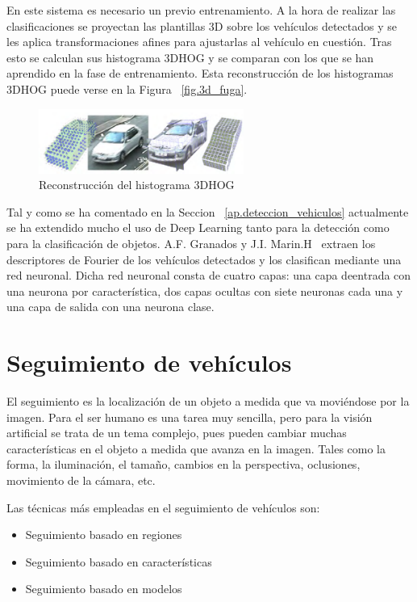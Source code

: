 En este sistema es necesario un previo entrenamiento. A la hora de realizar las clasificaciones se proyectan las plantillas 3D sobre los vehículos detectados y se les aplica transformaciones afines para ajustarlas al vehículo en cuestión. Tras esto se calculan sus histograma 3DHOG y se comparan con los que se han aprendido en la fase de entrenamiento. Esta reconstrucción de los histogramas 3DHOG puede verse en la Figura ~\ref{fig.3d_fuga}.

\begin{figure}[H]
  \begin{center}
    \includegraphics[width=0.6\textwidth]{figures/Estado_arte/3dhog_plantilla.png}
		\caption{Reconstrucción  del  histograma  3DHOG}
		\label{fig.3dhog_histograma}
		\end{center}
\end{figure}

Tal y como se ha comentado en la Seccion ~\ref{ap.deteccion_vehiculos} actualmente se ha extendido mucho el uso de Deep Learning tanto para la detección como para la clasificación de objetos. 
A.F. Granados y J.I. Marin.H~\cite{deteccion_flujo_vehicular} extraen los descriptores de Fourier de los vehículos detectados y los clasifican mediante una red neuronal. Dicha red neuronal consta de cuatro capas: una capa deentrada con una neurona por característica, dos capas ocultas con siete neuronas cada una y una capa de salida con una neurona clase. 


\section{Seguimiento de vehículos}

El seguimiento es la localización de un objeto a medida que va moviéndose por la imagen. Para el ser humano es una tarea muy sencilla, pero para la visión artificial se trata de un tema complejo, pues pueden cambiar muchas características en el objeto  a medida que avanza en la imagen. Tales como la forma, la iluminación, el tamaño, cambios en la perspectiva, oclusiones, movimiento de la cámara, etc.

Las técnicas más empleadas en el seguimiento de vehículos son:

\begin{itemize}
    \item Seguimiento basado en regiones
    \item Seguimiento basado en características
    \item Seguimiento basado en modelos
\end{itemize}

